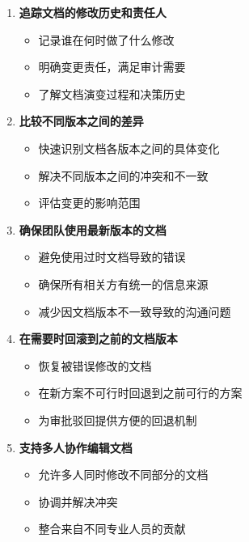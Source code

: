 \begin{enumerate}
\def\labelenumi{\arabic{enumi}.}
\tightlist
\item
  \textbf{追踪文档的修改历史和责任人}

  \begin{itemize}
  \tightlist
  \item
    记录谁在何时做了什么修改
  \item
    明确变更责任，满足审计需要
  \item
    了解文档演变过程和决策历史
  \end{itemize}
\item
  \textbf{比较不同版本之间的差异}

  \begin{itemize}
  \tightlist
  \item
    快速识别文档各版本之间的具体变化
  \item
    解决不同版本之间的冲突和不一致
  \item
    评估变更的影响范围
  \end{itemize}
\item
  \textbf{确保团队使用最新版本的文档}

  \begin{itemize}
  \tightlist
  \item
    避免使用过时文档导致的错误
  \item
    确保所有相关方有统一的信息来源
  \item
    减少因文档版本不一致导致的沟通问题
  \end{itemize}
\item
  \textbf{在需要时回滚到之前的文档版本}

  \begin{itemize}
  \tightlist
  \item
    恢复被错误修改的文档
  \item
    在新方案不可行时回退到之前可行的方案
  \item
    为审批驳回提供方便的回退机制
  \end{itemize}
\item
  \textbf{支持多人协作编辑文档}

  \begin{itemize}
  \tightlist
  \item
    允许多人同时修改不同部分的文档
  \item
    协调并解决冲突
  \item
    整合来自不同专业人员的贡献
  \end{itemize}
\end{enumerate}

